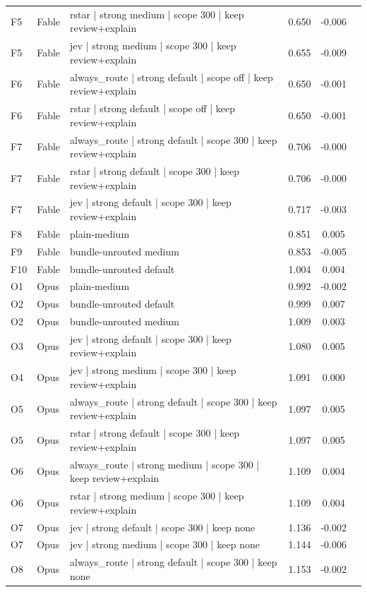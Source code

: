 \documentclass[11pt,letterpaper]{article}
\newcommand{\ok}{\textcolor{okgreen}{\ding{51}}}
\begin{document}
\begin{xltabular}{\textwidth}{l l >{\raggedright\arraybackslash}X S[table-format=1.3] S[table-format=-1.3] c}
F5 & Fable & rstar | strong medium | scope 300 | keep review+explain & 0.650 & -0.006 & \ok \\
F5 & Fable & jev | strong medium | scope 300 | keep review+explain & 0.655 & -0.009 & \ok \\
F6 & Fable & always\_route | strong default | scope off | keep review+explain & 0.650 & -0.001 & \ok \\
F6 & Fable & rstar | strong default | scope off | keep review+explain & 0.650 & -0.001 & \ok \\
F7 & Fable & always\_route | strong default | scope 300 | keep review+explain & 0.706 & -0.000 & \ok \\
F7 & Fable & rstar | strong default | scope 300 | keep review+explain & 0.706 & -0.000 & \ok \\
F7 & Fable & jev | strong default | scope 300 | keep review+explain & 0.717 & -0.003 & \ok \\
F8 & Fable & plain-medium & 0.851 & 0.005 & \ok \\
F9 & Fable & bundle-unrouted medium & 0.853 & -0.005 & \ok \\
F10 & Fable & bundle-unrouted default & 1.004 & 0.004 &  \\
O1 & Opus & plain-medium & 0.992 & -0.002 &  \\
O2 & Opus & bundle-unrouted default & 0.999 & 0.007 &  \\
O2 & Opus & bundle-unrouted medium & 1.009 & 0.003 &  \\
O3 & Opus & jev | strong default | scope 300 | keep review+explain & 1.080 & 0.005 &  \\
O4 & Opus & jev | strong medium | scope 300 | keep review+explain & 1.091 & 0.000 &  \\
O5 & Opus & always\_route | strong default | scope 300 | keep review+explain & 1.097 & 0.005 &  \\
O5 & Opus & rstar | strong default | scope 300 | keep review+explain & 1.097 & 0.005 &  \\
O6 & Opus & always\_route | strong medium | scope 300 | keep review+explain & 1.109 & 0.004 &  \\
O6 & Opus & rstar | strong medium | scope 300 | keep review+explain & 1.109 & 0.004 &  \\
O7 & Opus & jev | strong default | scope 300 | keep none & 1.136 & -0.002 &  \\
O7 & Opus & jev | strong medium | scope 300 | keep none & 1.144 & -0.006 &  \\
O8 & Opus & always\_route | strong default | scope 300 | keep none & 1.153 & -0.002 &  \\

\end{xltabular}
\end{document}

